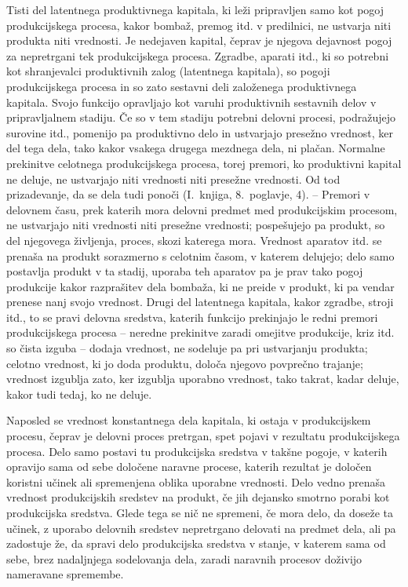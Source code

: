 \documentclass[kapital_02.tex]{subfiles}
\begin{document}
Tisti del latentnega produktivnega kapitala, ki leži pripravljen samo kot pogoj produkcijskega procesa, kakor bombaž, premog itd. v predilnici, ne ustvarja niti produkta niti vrednosti. Je nedejaven kapital, čeprav je njegova dejavnost pogoj za nepretrgani tek produkcijskega procesa. Zgradbe, aparati itd., ki so potrebni kot shranjevalci produktivnih zalog (latentnega kapitala), so pogoji produkcijskega procesa in so zato sestavni deli založenega produktivnega kapitala. Svojo funkcijo opravljajo kot varuhi produktivnih sestavnih delov v pripravljalnem stadiju. Če so \KPEstran v tem stadiju potrebni delovni procesi, podražujejo surovine itd., pomenijo pa produktivno delo in ustvarjajo presežno vrednost, ker del tega dela, tako kakor vsakega drugega mezdnega dela, ni plačan. Normalne prekinitve celotnega produkcijskega procesa, torej premori, ko produktivni kapital ne deluje, ne ustvarjajo niti vrednosti niti presežne vrednosti. Od tod prizadevanje, da se dela tudi ponoči (I.\ knjiga, 8.\ poglavje, 4). -- Premori v delovnem času, prek katerih mora delovni predmet med produkcijskim procesom, ne ustvarjajo niti vrednosti niti presežne vrednosti; pospešujejo pa produkt, so del njegovega življenja, proces, skozi katerega mora. Vrednost aparatov itd. se prenaša na produkt sorazmerno s celotnim časom, v katerem delujejo; delo samo postavlja produkt v ta stadij, uporaba teh aparatov pa je prav tako pogoj produkcije kakor razprašitev dela bombaža, ki ne preide v produkt, ki pa vendar prenese nanj svojo vrednost. Drugi del latentnega kapitala, kakor zgradbe, stroji itd., to se pravi delovna sredstva, katerih funkcijo prekinjajo le redni premori produkcijskega procesa -- neredne prekinitve zaradi omejitve produkcije, kriz itd. so čista izguba -- dodaja vrednost, ne sodeluje pa pri ustvarjanju produkta; celotno vrednost, ki jo doda produktu, določa njegovo povprečno trajanje; vrednost izgublja zato, ker izgublja uporabno vrednost, tako takrat, kadar deluje, kakor tudi tedaj, ko ne deluje.

Naposled se vrednost konstantnega dela kapitala, ki ostaja v produkcijskem procesu, čeprav je delovni proces pretrgan, spet pojavi v rezultatu produkcijskega procesa. Delo samo postavi tu produkcijska sredstva v takšne pogoje, v katerih opravijo sama od sebe določene naravne procese, katerih rezultat je določen koristni učinek ali spremenjena oblika uporabne vrednosti. Delo vedno prenaša vrednost produkcijskih sredstev na produkt, če jih dejansko smotrno porabi kot produkcijska sredstva. Glede tega se nič ne spremeni, če mora delo, da doseže ta učinek, z uporabo delovnih sredstev nepretrgano delovati na predmet dela, ali pa zadostuje že, da spravi delo produkcijska sredstva v stanje, v katerem sama od sebe, brez nadaljnjega \KPEstran sodelovanja dela, zaradi naravnih procesov doživijo nameravane spremembe.
\end{document}
